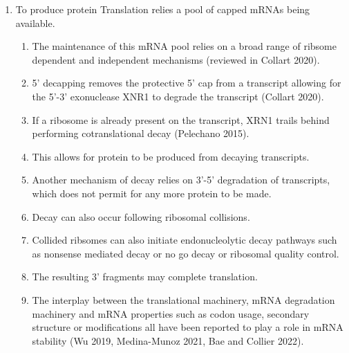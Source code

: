 \documentclass[review]{elsarticle}
\begin{document}
\begin{enumerate}
\item To produce protein Translation relies a pool of capped mRNAs being available.
\begin{enumerate}	
  \item The maintenance of this mRNA pool relies on a broad range of ribsome dependent and independent mechanisms (reviewed in Collart 2020).
  \item 5' decapping removes the protective 5' cap from a transcript allowing for the 5'-3' exonuclease XNR1 to degrade the transcript (Collart 2020).
  \item If a ribosome is already present on the transcript, XRN1 trails behind performing cotranslational decay (Pelechano 2015).
  \item This allows for protein to be produced from decaying transcripts.
  \item Another mechanism of decay relies on 3'-5' degradation of transcripts, which does not permit for any more protein to be made.
  \item Decay can also occur following ribosomal collisions.
  \item Collided ribsomes can also initiate endonucleolytic decay pathways such as  nonsense mediated decay or no go decay or ribosomal quality control.
  \item The resulting 3' fragments may complete translation.
  \item The interplay between the translational machinery, mRNA degradation machinery and mRNA properties such as codon usage, secondary structure or modifications all have been reported to play a role in mRNA stability (Wu 2019, Medina-Munoz 2021, Bae and Collier 2022).
\end{enumerate}


\end{enumerate}
\end{document}
